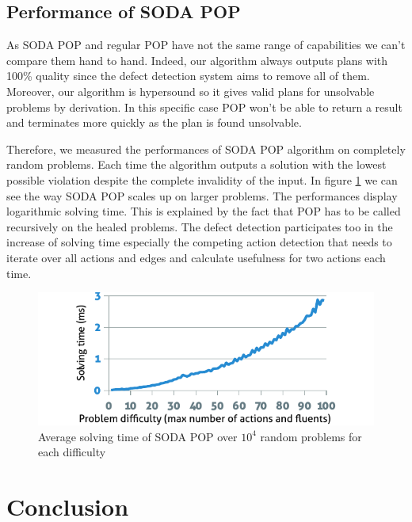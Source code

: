 \documentclass[]{article}
\begin{document}
\subsection{Performance of SODA POP}\label{performance-of-soda-pop}

As SODA POP and regular POP have not the same range of capabilities we
can't compare them hand to hand. Indeed, our algorithm always outputs
plans with 100\% quality since the defect detection system aims to
remove all of them. Moreover, our algorithm is hypersound so it gives
valid plans for unsolvable problems by derivation. In this specific case
POP won't be able to return a result and terminates more quickly as the
plan is found unsolvable.

Therefore, we measured the performances of SODA POP algorithm on
completely random problems. Each time the algorithm outputs a solution
with the lowest possible violation despite the complete invalidity of
the input. In figure \ref{fig:performance} we can see the way SODA POP
scales up on larger problems. The performances display logarithmic
solving time. This is explained by the fact that POP has to be called
recursively on the healed problems. The defect detection participates
too in the increase of solving time especially the competing action
detection that needs to iterate over all actions and edges and calculate
usefulness for two actions each time.

\begin{figure}[htbp]
\centering
\includegraphics{graphics/performance.pdf}
\caption{Average solving time of SODA POP over \(10^4\) random problems
for each difficulty\label{fig:performance}}
\end{figure}

\section*{Conclusion}\label{conclusion}
\end{document}
